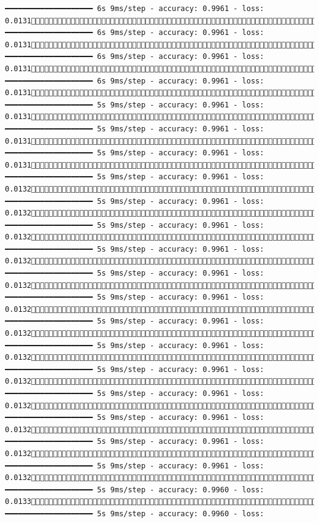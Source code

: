 \documentclass[
  letterpaper,
  DIV=11,
  numbers=noendperiod]{scrreprt}
\begin{document}
\begin{verbatim}
━━━━━━━━━━━━━━━━━━━━ 6s 9ms/step - accuracy: 0.9961 - loss: 0.01311189/1875 ━━━━━━━━━━━━━━━━━━━━ 6s 9ms/step - accuracy: 0.9961 - loss: 0.01311195/1875 ━━━━━━━━━━━━━━━━━━━━ 6s 9ms/step - accuracy: 0.9961 - loss: 0.01311201/1875 ━━━━━━━━━━━━━━━━━━━━ 6s 9ms/step - accuracy: 0.9961 - loss: 0.01311207/1875 ━━━━━━━━━━━━━━━━━━━━ 5s 9ms/step - accuracy: 0.9961 - loss: 0.01311213/1875 ━━━━━━━━━━━━━━━━━━━━ 5s 9ms/step - accuracy: 0.9961 - loss: 0.01311219/1875 ━━━━━━━━━━━━━━━━━━━━ 5s 9ms/step - accuracy: 0.9961 - loss: 0.01311225/1875 ━━━━━━━━━━━━━━━━━━━━ 5s 9ms/step - accuracy: 0.9961 - loss: 0.01321231/1875 ━━━━━━━━━━━━━━━━━━━━ 5s 9ms/step - accuracy: 0.9961 - loss: 0.01321237/1875 ━━━━━━━━━━━━━━━━━━━━ 5s 9ms/step - accuracy: 0.9961 - loss: 0.01321243/1875 ━━━━━━━━━━━━━━━━━━━━ 5s 9ms/step - accuracy: 0.9961 - loss: 0.01321248/1875 ━━━━━━━━━━━━━━━━━━━━ 5s 9ms/step - accuracy: 0.9961 - loss: 0.01321254/1875 ━━━━━━━━━━━━━━━━━━━━ 5s 9ms/step - accuracy: 0.9961 - loss: 0.01321261/1875 ━━━━━━━━━━━━━━━━━━━━ 5s 9ms/step - accuracy: 0.9961 - loss: 0.01321267/1875 ━━━━━━━━━━━━━━━━━━━━ 5s 9ms/step - accuracy: 0.9961 - loss: 0.01321272/1875 ━━━━━━━━━━━━━━━━━━━━ 5s 9ms/step - accuracy: 0.9961 - loss: 0.01321278/1875 ━━━━━━━━━━━━━━━━━━━━ 5s 9ms/step - accuracy: 0.9961 - loss: 0.01321284/1875 ━━━━━━━━━━━━━━━━━━━━ 5s 9ms/step - accuracy: 0.9961 - loss: 0.01321289/1875 ━━━━━━━━━━━━━━━━━━━━ 5s 9ms/step - accuracy: 0.9961 - loss: 0.01321295/1875 ━━━━━━━━━━━━━━━━━━━━ 5s 9ms/step - accuracy: 0.9961 - loss: 0.01321301/1875 ━━━━━━━━━━━━━━━━━━━━ 5s 9ms/step - accuracy: 0.9960 - loss: 0.01331306/1875 ━━━━━━━━━━━━━━━━━━━━ 5s 9ms/step - accuracy: 0.9960 - loss: 
\end{verbatim}
\end{document}
